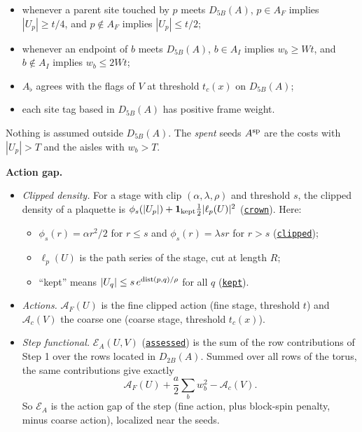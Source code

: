 \documentclass[
  letterpaper,
  11pt]{article}
\providecommand{\tightlist}{%
  \setlength{\itemsep}{0pt}\setlength{\parskip}{0pt}}
\begin{document}
\begin{itemize}
\tightlist
\item
  whenever a parent site touched by \(p\) meets \(D_{5B}(A)\),
  \(p\in A_F\) implies \(|U_p|\ge t/4\), and \(p\notin A_F\) implies
  \(|U_p|\le t/2\);
\item
  whenever an endpoint of \(b\) meets \(D_{5B}(A)\), \(b\in A_I\)
  implies \(w_b\ge Wt\), and \(b\notin A_I\) implies \(w_b\le2Wt\);
\item
  \(A_\flat\) agrees with the flags of \(V\) at threshold \(t_c(x)\) on
  \(D_{5B}(A)\);
\item
  each site tag based in \(D_{5B}(A)\) has positive frame weight.
\end{itemize}

Nothing is assumed outside \(D_{5B}(A)\). The \emph{spent} seeds
\(A^{\rm sp}\) are the costs with \(|U_p|>T\) and the aisles with
\(w_b>T\).

\textbf{Action gap.}

\begin{itemize}
\tightlist
\item
  \emph{Clipped density.} For a stage with clip
  \((\alpha,\lambda,\rho)\) and threshold \(s\), the clipped density of
  a plaquette is
  \(\phi_s(|U_p|)+\mathbf 1_{\rm kept}\tfrac12|\ell_p(U)|^2\)
  (\href{https://github.com/yang-mills-group/OpenAI-YM-20261028/blob/3456e5e75cf8d4cd558955a5c7638fba2d68f464/YM/Pressure/Rows.lean\#L68}{\texttt{crown}}).
  Here:

  \begin{itemize}
  \tightlist
  \item
    \(\phi_s(r)=\alpha r^2/2\) for \(r\le s\) and
    \(\phi_s(r)=\lambda sr\) for \(r>s\)
    (\href{https://github.com/yang-mills-group/OpenAI-YM-20261028/blob/3456e5e75cf8d4cd558955a5c7638fba2d68f464/YM/RG/PathActions.lean\#L218-L219}{\texttt{clipped}});
  \item
    \(\ell_p(U)\) is the path series of the stage, cut at length \(R\);
  \item
    ``kept'' means \(|U_q|\le s\,e^{{\rm dist}(p,q)/\rho}\) for all
    \(q\)
    (\href{https://github.com/yang-mills-group/OpenAI-YM-20261028/blob/3456e5e75cf8d4cd558955a5c7638fba2d68f464/YM/RG/PathActions.lean\#L210-L211}{\texttt{kept}}).
  \end{itemize}
\item
  \emph{Actions.} \(\mathcal A_F(U)\) is the fine clipped action (fine
  stage, threshold \(t\)) and \(\mathcal A_c(V)\) the coarse one (coarse
  stage, threshold \(t_c(x)\)).
\item
  \emph{Step functional.} \(\mathcal E_A(U,V)\)
  (\href{https://github.com/yang-mills-group/OpenAI-YM-20261028/blob/3456e5e75cf8d4cd558955a5c7638fba2d68f464/YM/Pressure/Seeds.lean\#L85}{\texttt{assessed}})
  is the sum of the row contributions of Step 1 over the rows located in
  \(D_{2B}(A)\). Summed over all rows of the torus, the same
  contributions give exactly
  \[\mathcal A_F(U)+\frac a2\sum_b w_b^2-\mathcal A_c(V).\] So
  \(\mathcal E_A\) is the action gap of the step (fine action, plus
  block-spin penalty, minus coarse action), localized near the seeds.
\end{itemize}
\end{document}
